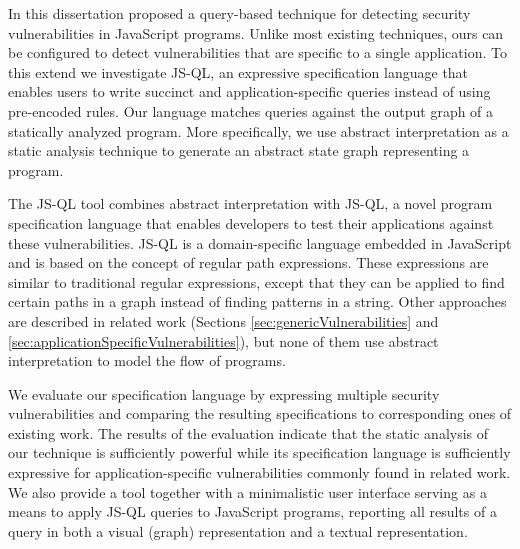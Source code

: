 In this dissertation proposed a query-based technique for detecting security vulnerabilities in JavaScript programs. 
Unlike most existing techniques, ours can be configured to detect vulnerabilities that are specific to a single application. To this extend we investigate JS-QL, an expressive specification language that enables users to write succinct and application-specific queries instead of using pre-encoded rules. Our language matches queries against the output graph of a statically analyzed program. More specifically, we use abstract interpretation as a static analysis technique to generate an abstract state graph representing a program.


The JS-QL tool combines abstract interpretation with JS-QL, a novel program specification language that enables developers to test their applications against these vulnerabilities. JS-QL is a domain-specific language embedded in JavaScript and is based on the concept of regular path expressions. These expressions are similar to traditional regular expressions, except that they can be applied to find certain paths in a graph instead of finding patterns in a string. Other approaches are described in related work (Sections \ref{sec:genericVulnerabilities} and \ref{sec:applicationSpecificVulnerabilities}), but none of them use abstract interpretation to model the flow of programs.

 We evaluate our specification language by expressing multiple security vulnerabilities and comparing the resulting specifications to corresponding ones of existing work.
 The results of the evaluation indicate that the static analysis of our technique is sufficiently powerful while its specification language is sufficiently expressive for application-specific vulnerabilities commonly found in related work. We also provide a tool together with a minimalistic user interface serving as a means to apply JS-QL queries to JavaScript programs, reporting all results of a query in both a visual (graph) representation and a textual representation. 

